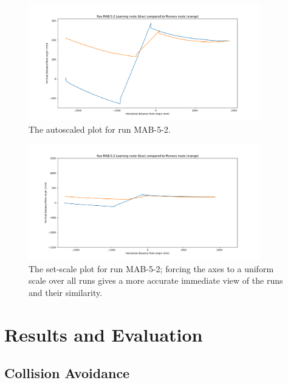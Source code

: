 \documentclass[a4paper,12pt]{article}
\begin{document}
\begin{figure}
  \centering
  \includegraphics[width=0.9\textwidth]{MAB-5-2}
  \caption{
   \label{fig:autoscalerun}The autoscaled plot for run MAB-5-2.
  }
\end{figure}

\begin{figure}
  \centering
  \includegraphics[width=0.9\textwidth]{MAB-5-2-S}
  \caption{\label{fig:setscalerun}The set-scale plot for run MAB-5-2; forcing the axes to a uniform scale over all runs gives a more accurate immediate
      view of the runs and their similarity.}
\end{figure}

\newpage

\section{ Results and Evaluation } \label{sec:results}
\subsection{Collision Avoidance}
\end{document}
